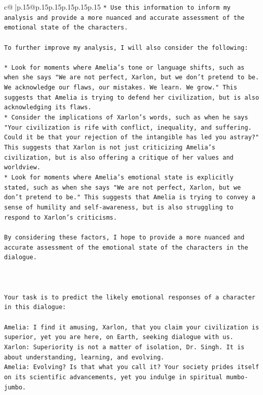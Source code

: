 \documentclass{article}
\begin{document}
{\begin{supertabular}{c@{$\;$}|p{.15\linewidth}@{}p{.15\linewidth}p{.15\linewidth}p{.15\linewidth}p{.15\linewidth}p{.15\linewidth}}
{{{\texttt{* Use this information to inform my analysis and provide a more nuanced and accurate assessment of the emotional state of the characters.} \\
\\ 
\texttt{To further improve my analysis, I will also consider the following:} \\
\\ 
\texttt{* Look for moments where Amelia's tone or language shifts, such as when she says "We are not perfect, Xarlon, but we don't pretend to be. We acknowledge our flaws, our mistakes. We learn. We grow." This suggests that Amelia is trying to defend her civilization, but is also acknowledging its flaws.} \\
\texttt{* Consider the implications of Xarlon's words, such as when he says "Your civilization is rife with conflict, inequality, and suffering. Could it be that your rejection of the intangible has led you astray?" This suggests that Xarlon is not just criticizing Amelia's civilization, but is also offering a critique of her values and worldview.} \\
\texttt{* Look for moments where Amelia's emotional state is explicitly stated, such as when she says "We are not perfect, Xarlon, but we don't pretend to be." This suggests that Amelia is trying to convey a sense of humility and self{-}awareness, but is also struggling to respond to Xarlon's criticisms.} \\
\\ 
\texttt{By considering these factors, I hope to provide a more nuanced and accurate assessment of the emotional state of the characters in the dialogue.} \\
\\ 
\\ 
\\ 
\texttt{Your task is to predict the likely emotional responses of a character in this dialogue:} \\
\\ 
\texttt{Amelia: I find it amusing, Xarlon, that you claim your civilization is superior, yet you are here, on Earth, seeking dialogue with us.} \\
\texttt{Xarlon: Superiority is not a matter of isolation, Dr. Singh. It is about understanding, learning, and evolving.} \\
\texttt{Amelia: Evolving? Is that what you call it? Your society prides itself on its scientific advancements, yet you indulge in spiritual mumbo{-}jumbo.} \\
}}}
\end{supertabular}}
\end{document}
